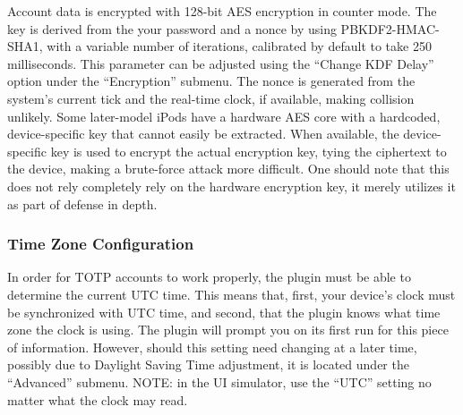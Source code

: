 Account data is encrypted with 128-bit AES encryption in counter
mode. The key is derived from the your password and a nonce by using
PBKDF2-HMAC-SHA1, with a variable number of iterations, calibrated by
default to take 250 milliseconds. This parameter can be adjusted using
the ``Change KDF Delay'' option under the ``Encryption'' submenu. The
nonce is generated from the system's current tick and the real-time
clock, if available, making collision unlikely. Some later-model iPods
have a hardware AES core with a hardcoded, device-specific key that
cannot easily be extracted. When available, the device-specific key is
used to encrypt the actual encryption key, tying the ciphertext to the
device, making a brute-force attack more difficult. One should note
that this does not rely completely rely on the hardware encryption
key, it merely utilizes it as part of defense in depth.


 {
  \subsubsection{Time Zone Configuration}
  In order for TOTP accounts to work properly, the plugin must be able
  to determine the current UTC time. This means that, first, your
  device's clock must be synchronized with UTC time, and second, that
  the plugin knows what time zone the clock is using. The plugin will
  prompt you on its first run for this piece of information. However,
  should this setting need changing at a later time, possibly due to
  Daylight Saving Time adjustment, it is located under the
  ``Advanced'' submenu. NOTE: in the UI simulator, use the ``UTC''
  setting no matter what the clock may read. }
